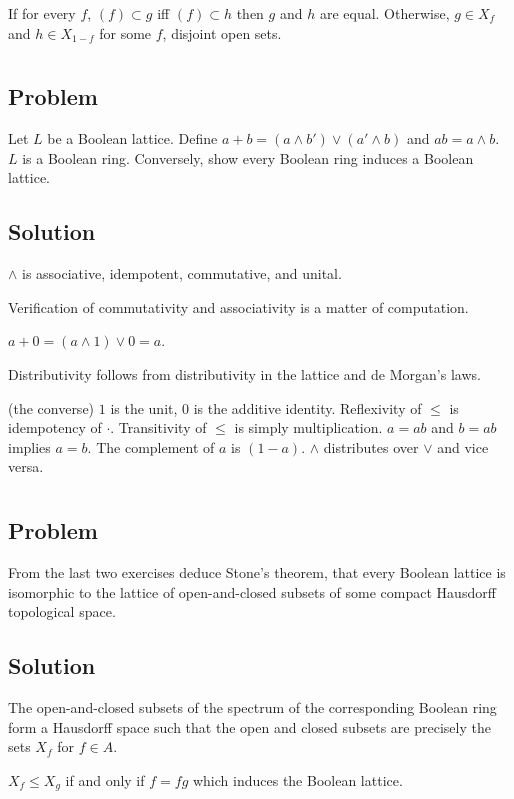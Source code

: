 \documentclass[book,12pt,oneside,openany]{memoir}
\begin{document}
If for every $f$, $(f) \subset g$ iff $(f) \subset h$
then $g$ and $h$ are equal.
Otherwise, $g\in X_f$ and $h\in X_{1-f}$ for some $f$, disjoint
open sets.
\section{}
\subsection{Problem}
Let $L$ be a Boolean lattice.
Define $a+b=(a\land b')\lor(a'\land b)$ and $ab=a\land b$.
$L$ is a Boolean ring.
Conversely, show every Boolean ring induces a Boolean lattice.
\subsection{Solution}
$\land$ is associative, idempotent, commutative, and unital.

Verification of commutativity and associativity is a matter
of computation.

$a+0=(a\land 1) \lor 0=a$.

Distributivity follows from distributivity in the lattice
and de Morgan's laws.

(the converse) $1$ is the unit, $0$ is the additive identity.
Reflexivity of $\le$ is idempotency of $\cdot$.
Transitivity of $\le$ is simply multiplication.
$a=ab$ and $b=ab$ implies $a=b$.
The complement of $a$ is $(1-a)$.
$\land$ distributes over $\lor$ and vice versa.
\section{}
\subsection{Problem}
From the last two exercises deduce Stone's theorem, that
every Boolean lattice is isomorphic to the lattice of
open-and-closed subsets of some compact Hausdorff
topological space.
\subsection{Solution}
The open-and-closed subsets of the spectrum of the corresponding
Boolean ring form a Hausdorff space such that the open and closed
subsets are precisely the sets $X_f$ for $f\in A$.

$X_f \le X_g$ if and only if $f=fg$ which induces the Boolean lattice.
\section{}
\end{document}
